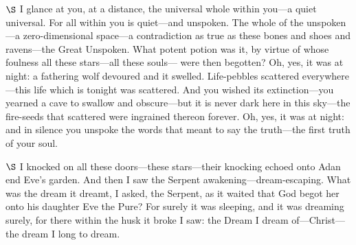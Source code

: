 \documentclass[a4paper]{article}
\begin{document}
$\S$ I glance at you, at a distance, the universal whole within you---a quiet
universal. For all within you is quiet---and unspoken. The whole of the
unspoken---a zero-dimensional space---a contradiction as true
as these bones and shoes and ravens---the Great Unspoken. What
potent potion was it, by virtue of whose foulness all these stars---all these
souls--- were then begotten? Oh, yes, it was at night: a fathering wolf
devoured and it swelled. Life-pebbles scattered everywhere---this life which is
tonight was scattered. And you wished its extinction---you yearned a cave to
swallow and obscure---but it is never dark here in this sky---the fire-seeds
that scattered were ingrained thereon forever. Oh, yes, it was at night: and in
silence you unspoke the words that meant to say the truth---the first truth of
your soul. 

$\S$ I knocked on all these doors---these stars---their knocking echoed onto
Adan end Eve's garden. And then I saw the Serpent awakening---dream-escaping. What was
the dream it dreamt, I asked, the Serpent, as it waited that God begot her onto 
his daughter Eve the Pure? For surely it was sleeping, and it was dreaming surely, for there
within the husk it broke I saw: the Dream I dream of---Christ---the
dream I long to dream.

    
\end{document}

